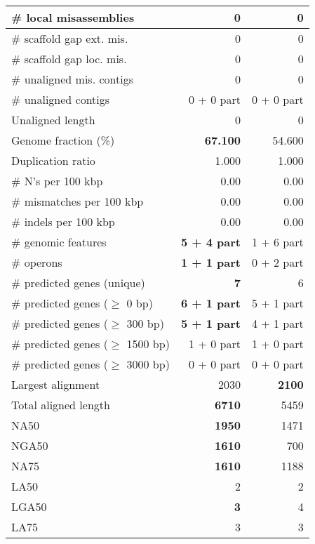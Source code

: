 \documentclass[12pt,a4paper]{article}
\begin{document}
\begin{table}[ht]
\begin{center}
\begin{tabular}{|l*{2}{|r}|}
\# local misassemblies & 0 & 0 \\ \hline
\# scaffold gap ext. mis. & 0 & 0 \\ \hline
\# scaffold gap loc. mis. & 0 & 0 \\ \hline
\# unaligned mis. contigs & 0 & 0 \\ \hline
\# unaligned contigs & 0 + 0 part & 0 + 0 part \\ \hline
Unaligned length & 0 & 0 \\ \hline
Genome fraction (\%) & {\bf 67.100} & 54.600 \\ \hline
Duplication ratio & 1.000 & 1.000 \\ \hline
\# N's per 100 kbp & 0.00 & 0.00 \\ \hline
\# mismatches per 100 kbp & 0.00 & 0.00 \\ \hline
\# indels per 100 kbp & 0.00 & 0.00 \\ \hline
\# genomic features & {\bf 5 + 4 part} & 1 + 6 part \\ \hline
\# operons & {\bf 1 + 1 part} & 0 + 2 part \\ \hline
\# predicted genes (unique) & {\bf 7} & 6 \\ \hline
\# predicted genes ($\geq$ 0 bp) & {\bf 6 + 1 part} & 5 + 1 part \\ \hline
\# predicted genes ($\geq$ 300 bp) & {\bf 5 + 1 part} & 4 + 1 part \\ \hline
\# predicted genes ($\geq$ 1500 bp) & 1 + 0 part & 1 + 0 part \\ \hline
\# predicted genes ($\geq$ 3000 bp) & 0 + 0 part & 0 + 0 part \\ \hline
Largest alignment & 2030 & {\bf 2100} \\ \hline
Total aligned length & {\bf 6710} & 5459 \\ \hline
NA50 & {\bf 1950} & 1471 \\ \hline
NGA50 & {\bf 1610} & 700 \\ \hline
NA75 & {\bf 1610} & 1188 \\ \hline
LA50 & 2 & 2 \\ \hline
LGA50 & {\bf 3} & 4 \\ \hline
LA75 & 3 & 3 \\ \hline
\end{tabular}
\end{center}
\end{table}
\end{document}
